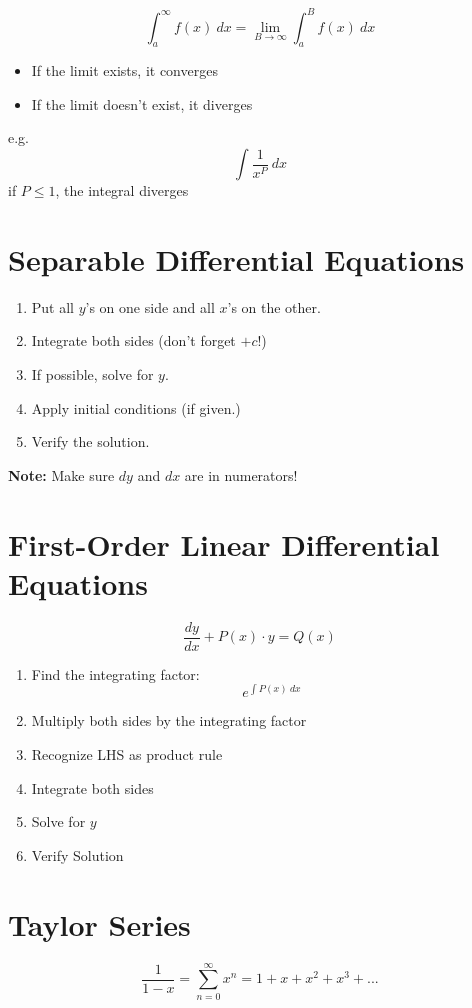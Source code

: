 \documentclass[12pt]{article}
\begin{document}
$$\int_a^\infty f(x)~dx = \lim_{B\to\infty} \int_a^B f(x) ~dx$$

\begin{itemize}
    \item If the limit exists, it converges
    \item If the limit doesn't exist, it diverges
\end{itemize}

\noindent e.g. $$\int \frac{1}{x^P} ~dx$$ \noindent if $P \leq 1$, the integral diverges


\section{Separable Differential Equations}

\begin{enumerate}
    \item Put all $y$'s on one side and all $x$'s on the other.
    \item Integrate both sides (don't forget $+c$!)
    \item If possible, solve for $y$.
    \item Apply initial conditions (if given.)
    \item Verify the solution.
\end{enumerate}



\textbf{Note:} Make sure $dy$ and $dx$ are in numerators!

\section{First-Order Linear Differential Equations}

$$\frac{dy}{dx} + P(x) \cdot y = Q(x)$$

\begin{enumerate}
    \item Find the integrating factor:
    $$e^{\int P(x)~dx}$$
    \item Multiply both sides by the integrating factor
    \item Recognize LHS as product rule
    \item Integrate both sides
    \item Solve for $y$
    \item Verify Solution

\end{enumerate}

\section{Taylor Series}
$$\frac{1}{1-x} = \sum_{n=0}^\infty x^n = 1+x+x^2+x^3+ ...$$
\end{document}
